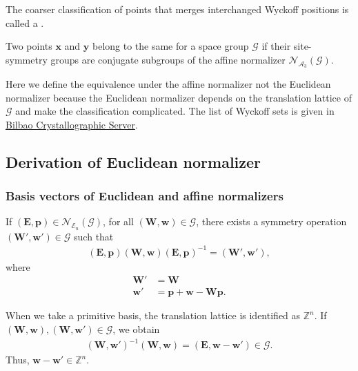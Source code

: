 
The coarser classification of points that merges interchanged Wyckoff positions is called a .
\begin{screen}
  \begin{defn}
    Two points $\bm{x}$ and $\bm{y}$ belong to the same  for a space group $\mathcal{G}$ if their site-symmetry groups are conjugate subgroups of the affine normalizer $\mathcal{N}_{\mathcal{A}_{3}}(\mathcal{G})$.
  \end{defn}
\end{screen}
Here we define the equivalence under the affine normalizer not the Euclidean normalizer because the Euclidean normalizer depends on the translation lattice of $\mathcal{G}$ and make the classification complicated.
The list of Wyckoff sets is given in \href{https://www.cryst.ehu.es/html/cryst/wyckoffsets.html}{Bilbao Crystallographic Server}.

%

\subsection{Derivation of Euclidean normalizer}

\subsubsection{Basis vectors of Euclidean and affine normalizers}

If $( \bm{E}, \bm{p} ) \in \mathcal{N}_{\mathcal{E}_{n}}(\mathcal{G}) $, for all $(\bm{W}, \bm{w} ) \in \mathcal{G}$, there exists a symmetry operation $(\bm{W}', \bm{w}' ) \in \mathcal{G}$ such that
\begin{align}
  (\bm{E}, \bm{p}) (\bm{W}, \bm{w}) (\bm{E}, \bm{p})^{-1} = (\bm{W}', \bm{w}'),
\end{align}
where
\begin{align}
  \bm{W}' &= \bm{W} \\
  \bm{w}' &= \bm{p} + \bm{w} - \bm{Wp}.
\end{align}

When we take a primitive basis, the translation lattice is identified as $\mathbb{Z}^{n}$.
If $(\bm{W}, \bm{w} ), (\bm{W}, \bm{w}') \in \mathcal{G}$, we obtain
\begin{align}
  (\bm{W}, \bm{w}')^{-1} (\bm{W}, \bm{w}) = (\bm{E}, \bm{w} - \bm{w}' ) \in \mathcal{G}.
\end{align}
Thus, $\mathbf{w} - \mathbf{w}' \in \mathbb{Z}^{n}$.

